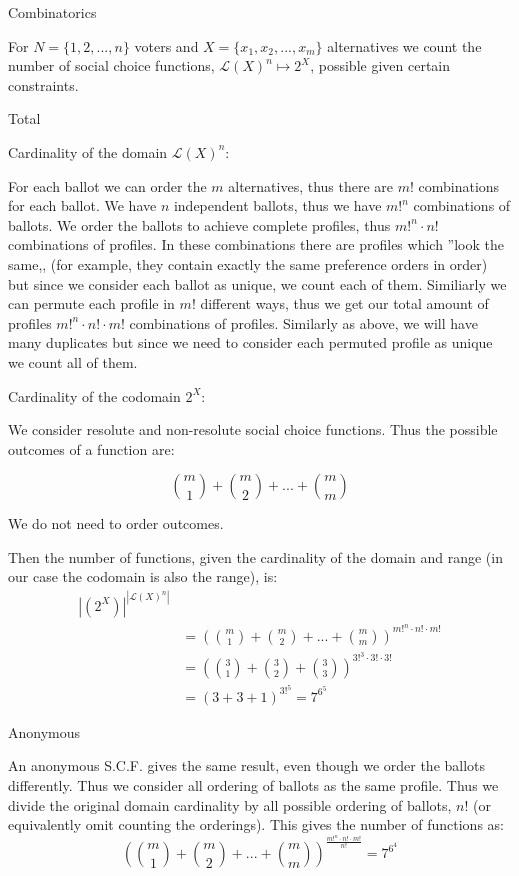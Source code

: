\documentclass[12pt]{article}
\newenvironment{question}[2][Question]{\begin{trivlist}
\item[\hskip \labelsep {\bfseries #1}\hskip \labelsep {\bfseries #2.}]}{\end{trivlist}}
\newenvironment{answer}[2][Answer]{\begin{trivlist}
\item[\hskip \labelsep {\bfseries #1}\hskip \labelsep {\bfseries #2:}]}{\end{trivlist}}
\begin{document}
\begin{question}{3}{Combinatorics}

For $N=\{1,2, ..., n\}$ voters and $X=\{x_1, x_2, ..., x_m\}$ alternatives we count the number of social choice functions, $\mathcal{L}(X)^n \mapsto 2^X$, possible given certain constraints.
\end{question}
\begin{answer}{a)}{Total}

Cardinality of the domain $\mathcal{L}(X)^n$:

For each ballot we can order the $m$ alternatives, thus there are $m!$ combinations for each ballot.
We have $n$ independent ballots, thus we have $m!^n$ combinations of ballots.
We order the ballots to achieve complete profiles, thus $m!^n \cdot n!$ combinations of profiles. In these combinations there are profiles which ''look the same,, (for example, they contain exactly the same preference orders in order) but since we consider each ballot as unique, we count each of them.
Similiarly we can permute each profile in $m!$ different ways, thus we get our total amount of profiles $m!^n \cdot n! \cdot m!$ combinations of profiles. Similarly as above, we will have many duplicates but since we need to consider each permuted profile as unique we count all of them.

Cardinality of the codomain $2^X$:

We consider resolute and non-resolute social choice functions. Thus the possible outcomes of a function are:

$$\binom{m}{1} + \binom{m}{2} + ... + \binom{m}{m}$$

We do not need to order outcomes.

Then the number of functions, given the cardinality of the domain and range (in our case the codomain is also the range), is:
\begin{align*}
|(2^X)|^{|\mathcal{L}(X)^n|}& \\
&=(\binom{m}{1} + \binom{m}{2} + ... + \binom{m}{m})^{m!^n \cdot n! \cdot m!} \\
&=(\binom{3}{1} + \binom{3}{2} + \binom{3}{3})^{3!^3 \cdot 3! \cdot 3!} \\
&=(3 + 3 + 1)^{3!^5}= 7^{6^5}
\end{align*}


\end{answer}
\begin{answer}{b)}{Anonymous}

An anonymous S.C.F. gives the same result, even though we order the ballots differently. Thus we consider all ordering of ballots as the same profile. Thus we divide the original domain cardinality by all possible ordering of ballots, $n!$ (or equivalently omit counting the orderings). This gives the number of functions as:
$$(\binom{m}{1} + \binom{m}{2} + ... + \binom{m}{m})^{\frac{m!^n \cdot n! \cdot m!}{n!}}=7^{6^4}$$
\end{answer}
\end{document}
